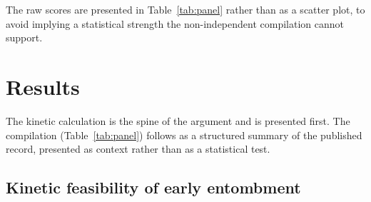 \documentclass[11pt]{article}
\begin{document}
\noindent The raw scores are presented in Table~\ref{tab:panel} rather than as a scatter plot, to
avoid implying a statistical strength the non-independent compilation cannot support.

\section{Results}

The kinetic calculation is the spine of the argument and is presented first. The compilation
(Table~\ref{tab:panel}) follows as a structured summary of the published record, presented as context
rather than as a statistical test.

\subsection{Kinetic feasibility of early entombment}
\end{document}
